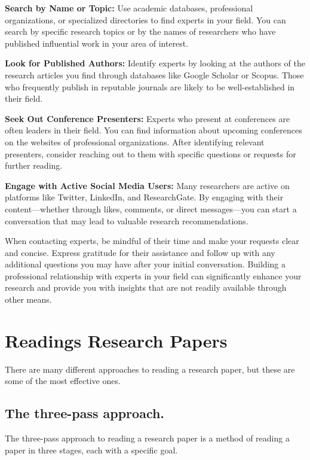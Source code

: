 \documentclass[
]{book}
\begin{document}
\textbf{Search by Name or Topic:} Use academic databases, professional organizations, or specialized directories to find experts in your field. You can search by specific research topics or by the names of researchers who have published influential work in your area of interest.

\textbf{Look for Published Authors:} Identify experts by looking at the authors of the research articles you find through databases like Google Scholar or Scopus. Those who frequently publish in reputable journals are likely to be well-established in their field.

\textbf{Seek Out Conference Presenters:} Experts who present at conferences are often leaders in their field. You can find information about upcoming conferences on the websites of professional organizations. After identifying relevant presenters, consider reaching out to them with specific questions or requests for further reading.

\textbf{Engage with Active Social Media Users:} Many researchers are active on platforms like Twitter, LinkedIn, and ResearchGate. By engaging with their content---whether through likes, comments, or direct messages---you can start a conversation that may lead to valuable research recommendations.

When contacting experts, be mindful of their time and make your requests clear and concise. Express gratitude for their assistance and follow up with any additional questions you may have after your initial conversation. Building a professional relationship with experts in your field can significantly enhance your research and provide you with insights that are not readily available through other means.

\section{Readings Research Papers}\label{readings-research-papers}

There are many different approaches to reading a research paper, but these are some of the most effective ones.

\subsection*{The three-pass approach.}\label{the-three-pass-approach.}

The three-pass approach to reading a research paper is a method of reading a paper in three stages, each with a specific goal.
\end{document}
